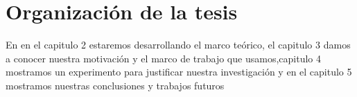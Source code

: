 \section{Organización de la tesis}

En en el capitulo 2 estaremos desarrollando el marco teórico, el capitulo 3 damos a conocer nuestra motivación y el marco de trabajo que usamos,capitulo 4 mostramos un experimento para justificar nuestra investigación y en el capitulo 5 mostramos nuestras conclusiones y trabajos futuros
